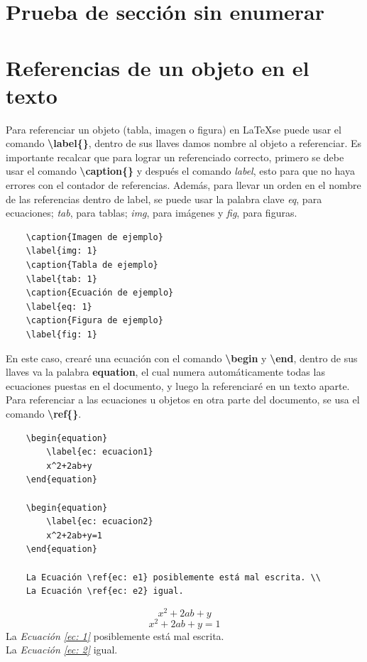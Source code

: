 \section*{Prueba de sección sin enumerar}



\section{Referencias de un objeto en el texto}
\hspace{0.55cm}Para referenciar un objeto (tabla, imagen o figura) en \LaTeX se puede usar el comando \textbf{\textbackslash{label\{\}}}, dentro de sus llaves damos nombre al objeto a referenciar. Es importante recalcar que para lograr un referenciado correcto, primero se debe usar el comando \textbf{\textbackslash{caption\{\}}} y después el comando \textit{label}, esto para que no haya errores con el contador de referencias. Además, para llevar un orden en el nombre de las referencias dentro de label, se puede usar la palabra clave \textit{eq}, para ecuaciones; \textit{tab}, para tablas; \textit{img}, para imágenes y \textit{fig}, para figuras.
\begin{lstlisting}
    \caption{Imagen de ejemplo}
    \label{img: 1}
    \caption{Tabla de ejemplo}
    \label{tab: 1}
    \caption{Ecuación de ejemplo}
    \label{eq: 1}
    \caption{Figura de ejemplo}
    \label{fig: 1}
\end{lstlisting}

En este caso, crearé una ecuación con el comando \textbf{\textbackslash{begin}} y \textbf{\textbackslash{end}}, dentro de sus llaves va la palabra \textbf{equation}, el cual numera automáticamente todas las ecuaciones puestas en el documento, y luego la referenciaré en un texto aparte. Para referenciar a las ecuaciones u objetos en otra parte del documento, se usa el comando \textbf{\textbackslash{ref\{\}}}.
\begin{lstlisting}
    \begin{equation}
        \label{ec: ecuacion1}
        x^2+2ab+y
    \end{equation}
    
    \begin{equation}
        \label{ec: ecuacion2}
        x^2+2ab+y=1
    \end{equation}
    
    La Ecuación \ref{ec: e1} posiblemente está mal escrita. \\
    La Ecuación \ref{ec: e2} igual.
\end{lstlisting}
\begin{equation}
    \label{ec: 1}
    x^2+2ab+y
\end{equation}
\begin{equation}
    \label{ec: 2}
    x^2+2ab+y=1
\end{equation}
La \textit{Ecuación \ref{ec: 1}} posiblemente está mal escrita. \\
La \textit{Ecuación \ref{ec: 2}} igual.